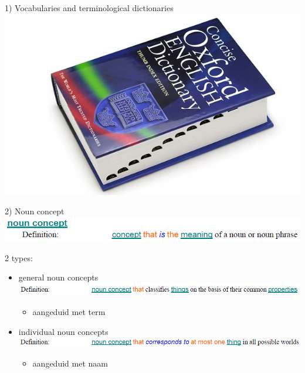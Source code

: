 \documentclass[t,12pt,english
\ifx\beamermode\undefined\else,\beamermode\fi
]{beamer}
\begin{document}
\begin{frame}{1) Vocabularies and terminological dictionaries}
	\includegraphics[width=\linewidth]{assets/dictionary}
\end{frame}

\begin{frame}{2) Noun concept}
	\includegraphics[width=\linewidth]{assets/nounConcept}
	\newline
	
	2 types:
	\begin{itemize}
		\item general noun concepts
		\includegraphics[width=\linewidth]{assets/generalNounConcept}
		\begin{itemize}
			\item aangeduid met term
		\end{itemize}
		\vspace*{0.5cm}
		\item individual noun concepts
		\includegraphics[width=\linewidth]{assets/individualNounConcept}
		\begin{itemize}
			\item aangeduid met naam
		\end{itemize}
	\end{itemize}
\end{frame}
\end{document}
